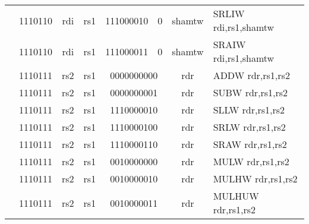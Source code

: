 \begin{table}[p]
\begin{small}
\begin{center}
\begin{tabular}{rcccccccccl}
&
\multicolumn{2}{|c|}{1110110} &
\multicolumn{1}{c|}{rdi} &
\multicolumn{1}{c|}{rs1} &
\multicolumn{3}{c|}{111000010} &
\multicolumn{1}{c|}{0} &
\multicolumn{1}{c|}{shamtw} & SRLIW rdi,rs1,shamtw \\
\cline{2-10}
  

&
\multicolumn{2}{|c|}{1110110} &
\multicolumn{1}{c|}{rdi} &
\multicolumn{1}{c|}{rs1} &
\multicolumn{3}{c|}{111000011} &
\multicolumn{1}{c|}{0} &
\multicolumn{1}{c|}{shamtw} & SRAIW rdi,rs1,shamtw \\
\cline{2-10}
  

&
\multicolumn{2}{|c|}{1110111} &
\multicolumn{1}{c|}{rs2} &
\multicolumn{1}{c|}{rs1} &
\multicolumn{4}{c|}{0000000000} &
\multicolumn{1}{c|}{rdr} & ADDW rdr,rs1,rs2 \\
\cline{2-10}
  

&
\multicolumn{2}{|c|}{1110111} &
\multicolumn{1}{c|}{rs2} &
\multicolumn{1}{c|}{rs1} &
\multicolumn{4}{c|}{0000000001} &
\multicolumn{1}{c|}{rdr} & SUBW rdr,rs1,rs2 \\
\cline{2-10}
  

&
\multicolumn{2}{|c|}{1110111} &
\multicolumn{1}{c|}{rs2} &
\multicolumn{1}{c|}{rs1} &
\multicolumn{4}{c|}{1110000010} &
\multicolumn{1}{c|}{rdr} & SLLW rdr,rs1,rs2 \\
\cline{2-10}
  

&
\multicolumn{2}{|c|}{1110111} &
\multicolumn{1}{c|}{rs2} &
\multicolumn{1}{c|}{rs1} &
\multicolumn{4}{c|}{1110000100} &
\multicolumn{1}{c|}{rdr} & SRLW rdr,rs1,rs2 \\
\cline{2-10}
  

&
\multicolumn{2}{|c|}{1110111} &
\multicolumn{1}{c|}{rs2} &
\multicolumn{1}{c|}{rs1} &
\multicolumn{4}{c|}{1110000110} &
\multicolumn{1}{c|}{rdr} & SRAW rdr,rs1,rs2 \\
\cline{2-10}
  

&
\multicolumn{2}{|c|}{1110111} &
\multicolumn{1}{c|}{rs2} &
\multicolumn{1}{c|}{rs1} &
\multicolumn{4}{c|}{0010000000} &
\multicolumn{1}{c|}{rdr} & MULW rdr,rs1,rs2 \\
\cline{2-10}
  

&
\multicolumn{2}{|c|}{1110111} &
\multicolumn{1}{c|}{rs2} &
\multicolumn{1}{c|}{rs1} &
\multicolumn{4}{c|}{0010000010} &
\multicolumn{1}{c|}{rdr} & MULHW rdr,rs1,rs2 \\
\cline{2-10}
  

&
\multicolumn{2}{|c|}{1110111} &
\multicolumn{1}{c|}{rs2} &
\multicolumn{1}{c|}{rs1} &
\multicolumn{4}{c|}{0010000011} &
\multicolumn{1}{c|}{rdr} & MULHUW rdr,rs1,rs2 \\
\cline{2-10}
  


\end{tabular}
\end{center}
\end{small}
\end{table}
